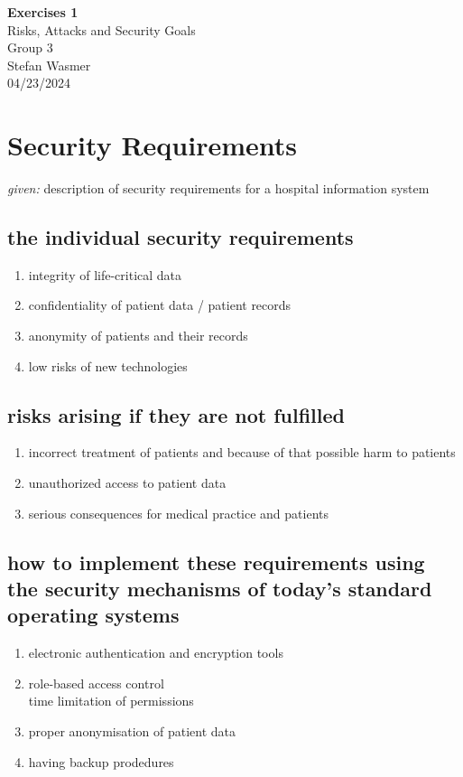 \documentclass[12pt]{article}
\begin{document}
\begin{titlepage}
    \centering
    \vspace*{1cm}
    {\Large\bfseries Exercises 1}\\[2ex]
    {\large Risks, Attacks and Security Goals}\\[0.5ex] 
    Group 3\\
    \vspace{2cm}
    Stefan Wasmer\\
    \vspace{5ex}
    {\large 04/23/2024}\\
    \vfill
\end{titlepage}

\section*{Security Requirements}
\textit{given:} description of security requirements for a hospital information system
\subsection*{the individual security requirements}
\begin{enumerate}
    \item integrity of life-critical data
    \item confidentiality of patient data / patient records
    \item anonymity of patients and their records
    \item low risks of new technologies
\end{enumerate}

\subsection*{risks arising if they are not fulfilled}
\begin{enumerate}
    \item incorrect treatment of patients and because of that possible harm to patients
    \item unauthorized access to patient data 
    \item serious consequences for medical practice and patients
\end{enumerate}

\subsection*{how to implement these requirements using the security mechanisms of today's standard operating systems}
\begin{enumerate}
    \item electronic authentication and encryption tools
    \item role-based access control\\
            time limitation of permissions
    \item proper anonymisation of patient data
    \item having backup prodedures 
\end{enumerate}
\end{document}
